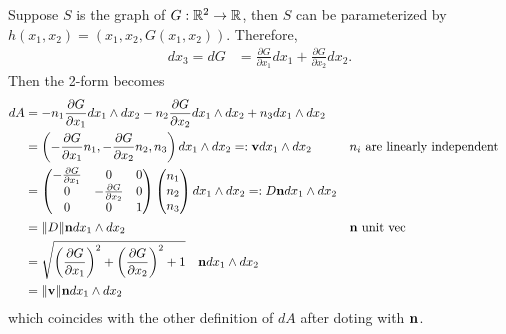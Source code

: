 \documentclass[12pt]{article}
\begin{document}
\begin{problem}[4.4.13]
Suppose $ S$ is the graph of $ G: \mathbb{R}^2 \to \mathbb{R}$, then $ S$ can be parameterized by $ h(x_1,x_2) = (x_1,x_2, G(x_1,x_2))$. Therefore,
\begin{align*}
	d x_3 = d G &= \frac{\partial G}{\partial x_1} dx_1 + \frac{\partial G}{\partial x_2} dx_2  .
\end{align*}
Then the 2-form becomes
\begin{align*}
	d A &= - n_1 \frac{\partial G}{\partial x_1} dx_1 \wedge dx_2 - n_2 \frac{\partial G}{\partial x_2} dx_1 \wedge dx_2  + n_3 dx_1 \wedge dx_2 \\
	    &= \left( -\frac{\partial G}{\partial x_1} n_1, -\frac{\partial G}{\partial x_2} n_2, n_3  \right) dx_1 \wedge dx_2=: {\mathbf{v}} dx_1 \wedge dx_2 && n_i\text{ are linearly independent} \\
	    &= \begin{pmatrix} - \frac{\partial G}{\partial x_1}&0&0\\0& - \frac{\partial G}{\partial x_2} &0\\ 0&0&1   \end{pmatrix} \begin{pmatrix} n_1\\n_2\\n_3 \end{pmatrix} dx_1 \wedge dx_2 =: D {\mathbf{n}} dx_1 \wedge dx_2\\
	    &= {\left\lVert{ D}\right\rVert} {\mathbf{n}} dx_1 \wedge dx_2  && {\mathbf{n}}  \text{ unit vec} \\
	    &= \sqrt{ \left( \frac{\partial G}{\partial x_1} \right)^2 + \left( \frac{\partial G}{\partial x_2}  \right)^2 + 1 }\quad  {\mathbf{n}} dx_1 \wedge dx_2 \\
	    &= {\left\lVert{ {\mathbf{v}}}\right\rVert} {\mathbf{n}} dx_1 \wedge dx_2
\end{align*}
which coincides with the other definition of $ dA$ after doting with $ {\mathbf{n}}$.
\end{problem}
\end{document}
